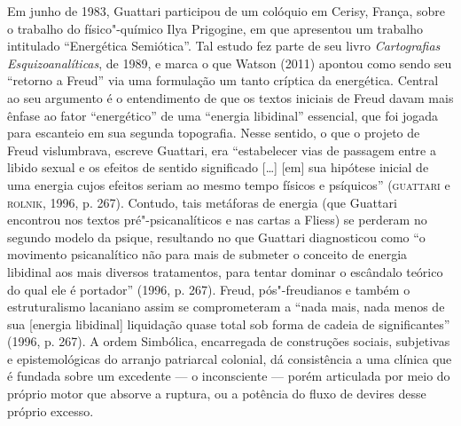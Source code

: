 Em junho de 1983, Guattari participou de um colóquio em Cerisy, França,
sobre o trabalho do físico"-químico Ilya Prigogine, em que apresentou um
trabalho intitulado ``Energética Semiótica''. Tal estudo fez parte de
seu livro \emph{Cartografias Esquizoanalíticas}, de 1989, e marca o que
Watson (2011) apontou como sendo seu ``retorno a Freud'' via uma
formulação um tanto críptica da energética. Central ao seu argumento é o
entendimento de que os textos iniciais de Freud davam mais ênfase ao
fator ``energético'' de uma ``energia libidinal'' essencial, que foi
jogada para escanteio em sua segunda topografia. Nesse sentido, o que o
projeto de Freud vislumbrava, escreve Guattari, era ``estabelecer vias
de passagem entre a libido sexual e os efeitos de sentido significado
{[}\ldots{}{]} {[}em{]} sua hipótese inicial de uma energia cujos
efeitos seriam ao mesmo tempo físicos e psíquicos'' (\textsc{guattari} e \textsc{rolnik},
1996, p. 267). Contudo, tais metáforas de energia (que Guattari
encontrou nos textos pré"-psicanalíticos e nas cartas a Fliess) se
perderam no segundo modelo da psique, resultando no que Guattari
diagnosticou como ``o movimento psicanalítico não para mais de submeter
o conceito de energia libidinal aos mais diversos tratamentos, para
tentar dominar o escândalo teórico do qual ele é portador'' (1996, p. 267). Freud, pós"-freudianos e também o estruturalismo
lacaniano assim se comprometeram a ``nada mais, nada menos de sua
{[}energia libidinal{]} liquidação quase total sob forma de cadeia de
significantes'' (1996, p. 267). A ordem Simbólica,
encarregada de construções sociais, subjetivas e epistemológicas do
arranjo patriarcal colonial, dá consistência a uma clínica que é fundada
sobre um excedente --- o inconsciente --- porém articulada por meio do
próprio motor que absorve a ruptura, ou a potência do fluxo de devires
desse próprio excesso.

